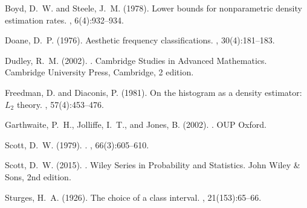 \documentclass[19pt,landscaoe]{article}
\begin{document}
\newpage

% 
\begin{thebibliography}{}

    Boyd, D.~W. and Steele, J.~M. (1978).
    \newblock Lower bounds for nonparametric density estimation rates.
    , 6(4):932--934.
    
    Doane, D.~P. (1976).
    \newblock Aesthetic frequency classifications.
    , 30(4):181--183.
    
    Dudley, R.~M. (2002).
    .
    \newblock Cambridge Studies in Advanced Mathematics. Cambridge University Press, Cambridge, 2 edition.
    
    Freedman, D. and Diaconis, P. (1981).
    \newblock On the histogram as a density estimator: $L_2$ theory.
    , 57(4):453--476.
    
    Garthwaite, P.~H., Jolliffe, I.~T., and Jones, B. (2002).
    .
    \newblock OUP Oxford.
    
    Scott, D.~W. (1979).
    .
    , 66(3):605--610.
    
    Scott, D.~W. (2015).
    .
    \newblock Wiley Series in Probability and Statistics. John Wiley \& Sons, 2nd edition.
    
    Sturges, H.~A. (1926).
    \newblock The choice of a class interval.
    , 21(153):65--66.
    
    \end{thebibliography}
    
\end{document}
